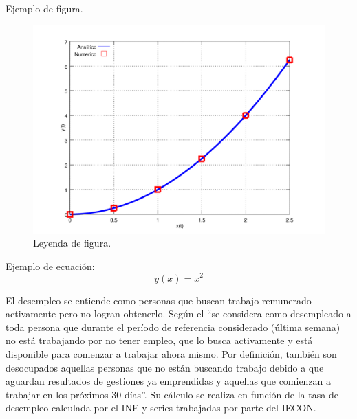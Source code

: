 Ejemplo de figura.

\begin{figure}[h!]
\label{fig:comp}
\includegraphics[width=.8\textwidth]{imagenes/chap4/x_vs_y}
\caption{Leyenda de figura.}
\end{figure}
Ejemplo de ecuación:
\begin{equation}
y(x)=x^2
\end{equation}




El desempleo se entiende como personas que buscan trabajo remunerado activamente pero no logran obtenerlo. Según el \cite{INE2019} ``se considera como desempleado a toda persona que durante el período de referencia considerado (última semana) no está trabajando por no tener empleo, que lo busca activamente y está disponible para comenzar a trabajar ahora mismo. Por definición, también son desocupados aquellas personas que no están buscando trabajo debido a que aguardan resultados de gestiones ya emprendidas y aquellas que comienzan a trabajar en los próximos 30 días''. 
Su cálculo se realiza en función de la tasa de desempleo calculada por el INE y series trabajadas por parte del IECON.


